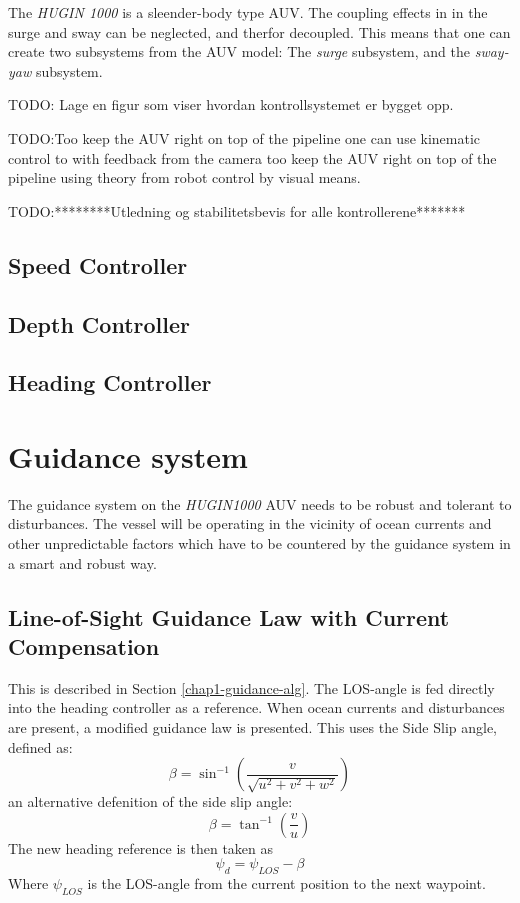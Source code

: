 	The \textit{HUGIN 1000} is a sleender-body type AUV. The coupling effects in in the surge and sway can be neglected, and therfor decoupled. This means that one can create two subsystems from the AUV model: The \textit{surge} subsystem, and the \textit{sway-yaw} subsystem. 
	
	TODO: Lage en figur som viser hvordan kontrollsystemet er bygget opp.
	
	TODO:Too keep the AUV right on top of the pipeline one can use kinematic control to with feedback from the camera too keep the AUV right on top of the pipeline using theory from robot control by visual means.
	
	
	TODO:********Utledning og stabilitetsbevis for alle kontrollerene*******
	\subsection{Speed Controller}
	
	
	
	\subsection{Depth Controller}

	
	
	\subsection{Heading Controller}
	
	
\section{Guidance system}
	The guidance system on the \textit{HUGIN1000} AUV needs to be robust and tolerant to disturbances. The vessel will be operating in the vicinity of ocean currents and other unpredictable factors which have to be countered by the guidance system in a smart and robust way.
	
	
	
	\subsection{Line-of-Sight Guidance Law with Current Compensation}
		This is described in Section \ref{chap1-guidance-alg}. The LOS-angle is fed directly into the heading controller as a reference. When ocean currents and disturbances are present, a modified guidance law is presented. This uses the Side Slip angle, defined as:
		\begin{equation}
			\label{eq:chap2-sideslip}
			\beta = \sin^{-1} ( \frac{v}{\sqrt{u^2 + v^2 + w^2}})
		\end{equation}
		an alternative defenition of the side slip angle:
		\begin{equation*}
			\beta = \tan^{-1} (\frac{v}{u})
		\end{equation*}
		The new heading reference is then taken as
		\begin{equation}
			\label{eq:chap2-los-law}
			\psi_d = \psi_{LOS} - \beta
		\end{equation}
		Where $\psi_{LOS}$ is the LOS-angle from the current position to the next waypoint.
		
